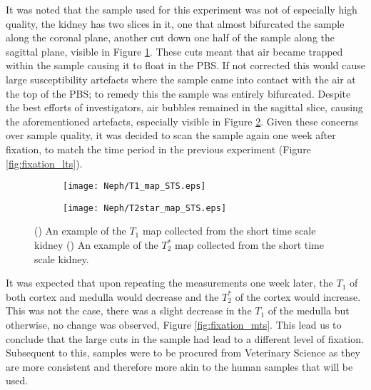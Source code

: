 It was noted that the sample used for this experiment was not of especially high quality, the kidney has two slices in it, one that almost bifurcated the sample along the coronal plane, another cut down one half of the sample along the sagittal plane, visible in Figure \ref{fig:fixation_t1map_3t_sts}. These cuts meant that air became trapped within the sample causing it to float in the \ac{PBS}. If not corrected this would cause large susceptibility artefacts where the sample came into contact with the air at the top of the \ac{PBS}; to remedy this the sample was entirely bifurcated. Despite the best efforts of investigators, air bubbles remained in the sagittal slice, causing the aforementioned artefacts, especially visible in Figure \ref{fig:fixation_t2starmap_3t_sts}. Given these concerns over sample quality, it was decided to scan the sample again one week after fixation, to match the time period in the previous experiment (Figure \ref{fig:fixation_lts}).\\

\begin{figure}[H]
	\centering
	\begin{subfigure}[c]{0.47\textwidth}
		\centering
		\texttt{[image: Neph/T1\_map\_STS.eps]}
		\caption{}
		\label{fig:fixation_t1map_3t_sts}
	\end{subfigure}
	\hfill
	\begin{subfigure}[c]{0.47\textwidth}
		\centering
		\texttt{[image: Neph/T2star\_map\_STS.eps]}
		\caption{}
		\label{fig:fixation_t2starmap_3t_sts}
	\end{subfigure}
	\caption{() An example of the $T_1$ map collected from the short time scale kidney () An example of the $T_2^*$ map collected from the short time scale kidney.}
	\label{fig:neph_maps_sts}
\end{figure}

It was expected that upon repeating the measurements one week later, the $T_1$ of both cortex and medulla would decrease and the $T_2^*$ of the cortex would increase. This was not the case, there was a slight decrease in the $T_1$ of the medulla but otherwise, no change was observed, Figure \ref{fig:fixation_mts}. This lead us to conclude that the large cuts in the sample had lead to a different level of fixation. Subsequent to this, samples were to be procured from Veterinary Science as they are more consistent and therefore more akin to the human samples that will be used.\\

